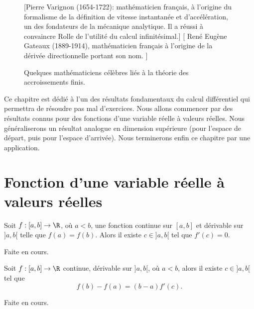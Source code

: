 \documentclass[class=report,crop=false]{standalone}
\begin{document}
\begin{figure}[!h]
    [Pierre Varignon (1654-1722): mathématicien français, à l'origine du formalisme de la définition de vitesse instantanée et d'accélération, un des fondateurs de la mécanique analytique. Il a réussi à convaincre Rolle de l'utilité du calcul infinitésimal.]
    {
        \label{fig:varignon}
    }
    [\color{blue} René Eugène Gateaux (1889-1914), mathématicien français à l'origine de la dérivée directionnelle portant son nom. ]
    {
        \label{fig:gateaux}
    }
    \caption{Quelques mathématiciens célèbres liés à la théorie des accroissements finis.}
    \label{fig:math4}
\end{figure}
  
  
  Ce chapitre est dédié à l'un des résultats fondamentaux du calcul différentiel qui permettra de résoudre pas mal d'exercices. Nous allons commencer par des 
  résultats connus pour des fonctions d'une variable réelle à valeurs réelles. Nous généraliserons un résultat analogue en dimension supérieure (pour l'espace de départ, puis pour l'espace d'arrivée). Nous terminerons enfin ce chapitre par une application.
  \section{Fonction d'une variable r\'eelle \`a valeurs r\'eelles}
  
  \begin{theoreme}
  \textcolor[rgb]{0.44,0.00,0.87}{Soit $f:[a,b] \rightarrow \R$, o\`u $a<b$, une fonction continue sur $[a,b]$ et d\'erivable sur
  $]a,b[$ telle que $f(a)=f(b)$. Alors il existe $c \in ]a,b[$ tel que $f'(c)=0$.}
  \end{theoreme}
   Faite en cours.
  
  
 \begin{theoreme}
  \textcolor[rgb]{0.44,0.00,0.87}{
    Soit $f:[a,b] \rightarrow \R$ continue, d\'erivable sur $]a,b[$,  o\`u $a<b$, alors il existe $c \in ]a,b[$ tel que
    \begin{equation*}
      f(b)-f(a)=(b-a)f'(c).
    \end{equation*}}
  \end{theoreme}
   Faite en cours.
\end{document}

